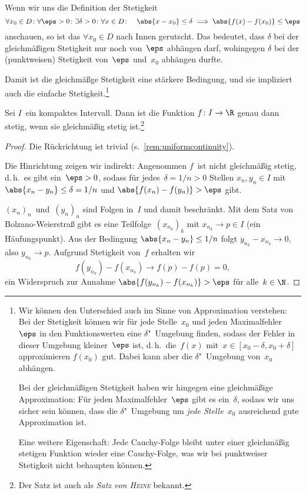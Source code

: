 \documentclass[a4paper]{article}
\begin{document}
\begin{remark}\label{rem:uniformcontinuity}
    Wenn wir uns die Definition der Stetigkeit
    \begin{equation*}
        \forall x_0 \in D\colon \forall \eps > 0\colon \exists \delta > 0\colon \forall x \in D\colon\quad \abs{x-x_0} \leq \delta \implies \abs{f(x)-f(x_0)} \leq \eps
    \end{equation*}
    anschauen, so ist das $\forall x_0 \in D$ nach Innen gerutscht. Das bedeutet, dass $\delta$ bei der gleichmäßigen Stetigkeit nur noch von~$\eps$ abhängen darf, wohingegen $\delta$ bei der (punktweisen) Stetigkeit von~$\eps$ und~$x_0$ abhängen durfte.

    Damit ist die gleichmäßge Stetigkeit eine stärkere Bedingung, und sie impliziert auch die einfache Stetigkeit.\footnote{Wir können den Unterschied auch im Sinne von Approximation verstehen: Bei der Stetigkeit können wir für jede Stelle~$x_0$ und jeden Maximalfehler~$\eps$ in den Funktionswerten eine $\delta$"~Umgebung finden, sodass der Fehler in dieser Umgebung kleiner~$\eps$ ist, d.\,h.\ die~$f(x)$ mit~$x \in [x_0-\delta,x_0+\delta]$ approximieren $f(x_0)$ gut. Dabei kann aber die $\delta$"~Umgebung von~$x_0$ abhängen.
    
    Bei der gleichmäßigen Stetigkeit haben wir hingegen eine gleichmäßige Approximation: Für jeden Maximalfehler~$\eps$ gibt es ein~$\delta$, sodass wir uns sicher sein können, dass die $\delta$"~Umgebung um \emph{jede Stelle~$x_0$} ausreichend gute Approximation ist.
    
    Eine weitere Eigenschaft: Jede Cauchy-Folge bleibt unter einer gleichmäßig stetigen Funktion wieder eine Cauchy-Folge, was wir bei punktweiser Stetigkeit nicht behaupten können.}
\end{remark}

\begin{theorem}
    Sei $I$~ein kompaktes Intervall. Dann ist die Funktion $f\colon I \to \R$ genau dann stetig, wenn sie gleichmäßig stetig ist.\footnote{Der Satz ist auch als \emph{Satz von \textsc{Heine}} bekannt.}
\end{theorem}

\begin{proof}
    Die Rückrichtung ist trivial (s.~\cref{rem:uniformcontinuity}).

    Die Hinrichtung zeigen wir indirekt: Angenommen $f$~ist nicht gleichmäßig stetig, d.\,h.\ es gibt ein~$\eps > 0$, sodass für jedes~$\delta = 1/n > 0$ Stellen $x_n,y_n \in I$ mit $\abs{x_n-y_n} \leq \delta = 1/n$ und $\abs{f(x_n)-f(y_n)} > \eps$ gibt.

    $(x_n)_n$~und~$(y_n)_n$ sind Folgen in~$I$ und damit beschränkt. Mit dem Satz von Bolzano-Weierstraß gibt es eine Teilfolge~$(x_{n_k})_k$ mit $x_{n_k} \to p \in I$ (ein Häufungspunkt). Aus der Bedingung $\abs{x_n-y_n} \leq 1/n$ folgt $y_{n_k}-x_{n_k} \to 0$, also $y_{n_k} \to p$. Aufgrund Stetigkeit von~$f$ erhalten wir
    \begin{equation*}
        f(y_{n_k}) - f(x_{n_k}) \to f(p) - f(p) = 0,
    \end{equation*}
    ein Widerspruch zur Annahme $\abs{f(y_{n_k})-f(x_{n_k})} > \eps$ für alle~$k \in \N$.
\end{proof}
\end{document}
